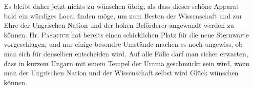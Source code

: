 Es bleibt daher jetzt nichts zu wünschen übrig, als dass dieser schöne Apparat bald ein würdiges Local finden möge, um zum Besten der Wissenschaft und zur Ehre der Ungrischen Nation und der hohen Beförderer angewandt werden zu können. Hr. \textsc{Pasquich} hat bereits einen schicklichen Platz für die neue Sternwarte vorgeschlagen, und nur einige besondre Umstände machen es noch ungewiss, ob man sich für denselben entscheiden wird. Auf alle Fälle darf man sicher erwarten, dass in kurzem Ungarn mit einem Tempel der Urania geschmückt sein wird, wozu man der Ungrischen Nation und der Wissenschaft selbst wird Glück wünschen können.

